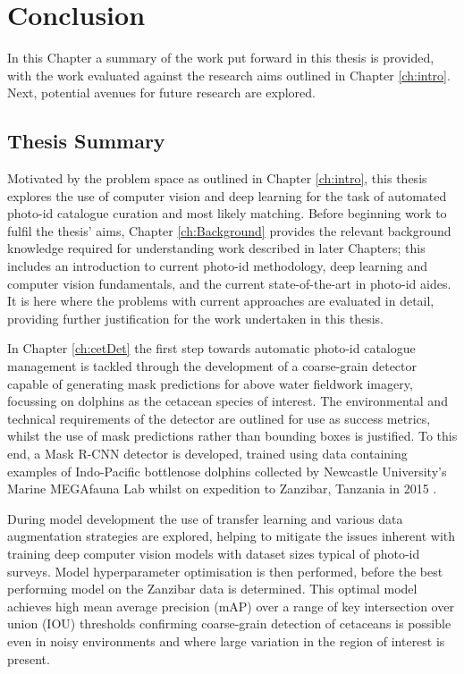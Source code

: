 \chapter{Conclusion}\label{ch:Conclusion}

In this Chapter a summary of the work put forward in this thesis is provided, with the work evaluated against the research aims outlined in Chapter \ref{ch:intro}. Next, potential avenues for future research are explored. 

\section{Thesis Summary}\label{ch:Conclusion,sec:Summary}

Motivated by the problem space as outlined in Chapter \ref{ch:intro}, this thesis explores the use of computer vision and deep learning for the task of automated photo-id catalogue curation and most likely matching. Before beginning work to fulfil the thesis' aims, Chapter \ref{ch:Background} provides the relevant background knowledge required for understanding work described in later Chapters; this includes an introduction to current photo-id methodology, deep learning and computer vision fundamentals, and the current state-of-the-art in photo-id aides. It is here where the problems with current approaches are evaluated in detail, providing further justification for the work undertaken in this thesis. 

In Chapter \ref{ch:cetDet} the first step towards automatic photo-id catalogue management is tackled through the development of a coarse-grain detector capable of generating mask predictions for above water fieldwork imagery, focussing on dolphins as the cetacean species of interest. The environmental and technical requirements of the detector are outlined for use as success metrics, whilst the use of mask predictions rather than bounding boxes is justified. To this end, a Mask R-CNN \cite{he_mask_2017} detector is developed, trained using data  containing examples of Indo-Pacific bottlenose dolphins collected by Newcastle University's Marine MEGAfauna Lab whilst on expedition to Zanzibar, Tanzania in 2015 \cite{sharpe_indian_2019}. 

During model development the use of transfer learning and various data augmentation strategies are explored, helping to mitigate the issues inherent with training deep computer vision models with dataset sizes typical of photo-id surveys. Model hyperparameter optimisation is then performed, before the best performing model on the Zanzibar data is determined. This optimal model achieves high mean average precision (mAP) over a range of key intersection over union (IOU) thresholds confirming coarse-grain detection of cetaceans is possible even in noisy environments and where large variation in the region of interest is present. 

